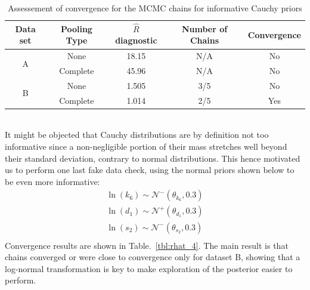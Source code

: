 \documentclass[11pt]{article}
\begin{document}
\begin{table}[!h]
    \centering
    \caption{Assessement of convergence for the MCMC chains for informative Cauchy priors}
    \begin{tabular}{c|c||c|c|c}
        \hline
        Data set & Pooling Type & $\hat{R}$ diagnostic & Number of Chains & Convergence  \\ \hline 
        \multirow{2}{*}{A}      & None  & 18.15 & N/A & No \\
                                & Complete & 45.96 & N/A & No \\ \hline 
        \multirow{2}{*}{B}      & None  & 1.505 & 3/5 & No \\
                                & Complete & 1.014 & 2/5 & Yes \\ \hline 
    \end{tabular}
    \label{tbl:rhat_3}
\end{table}
\\[12pt]
It might be objected that Cauchy distributions are by definition not too informative since a non-negligible portion of their mass stretches well beyond their standard deviation, contrary to normal distributions. This hence motivated us to perform one last fake data check, using the normal priors shown below to be even more informative: 
\begin{align*}
    \ln(k_6) \sim \mathcal{N}^-(\theta_{k_6}, 0.3) \\ 
    \ln(d_1) \sim \mathcal{N}^+(\theta_{d_1}, 0.3) \\ 
    \ln(s_2) \sim \mathcal{N}^-(\theta_{s_2}, 0.3) \\ 
\end{align*}
Convergence results are shown in Table.~\ref{tbl:rhat_4}. The main result is that chains converged or were close to convergence only for dataset B, showing that a log-normal transformation is key to make exploration of the posterior easier to perform.
\end{document}
